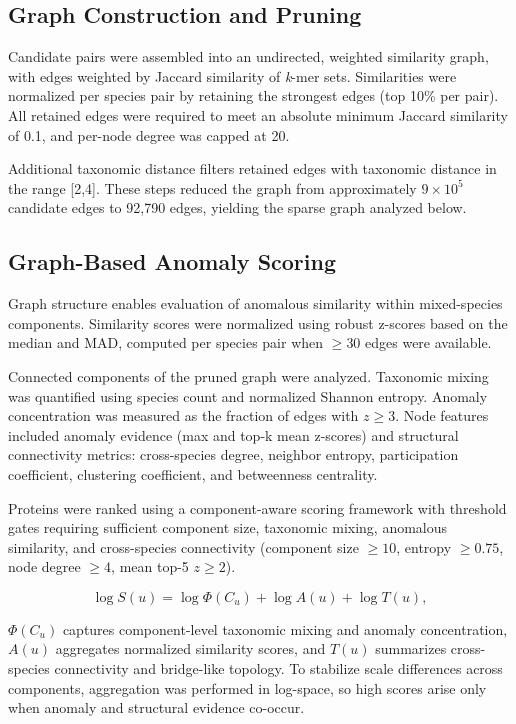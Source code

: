\documentclass[11pt]{article}
\begin{document}
\subsection{Graph Construction and Pruning}
Candidate pairs were assembled into an undirected, weighted similarity graph, with edges weighted by Jaccard similarity of \textit{k}-mer sets. Similarities were normalized per species pair by retaining the strongest edges (top 10\% per pair). All retained edges were required to meet an absolute minimum Jaccard similarity of 0.1, and per-node degree was capped at 20.


Additional taxonomic distance filters retained edges with taxonomic distance in the range [2,4]. These steps reduced the graph from approximately $9\times 10^5$ candidate edges to 92{,}790 edges, yielding the sparse graph analyzed below.

\subsection{Graph-Based Anomaly Scoring}
Graph structure enables evaluation of anomalous similarity within mixed-species components. Similarity scores were normalized using robust z-scores based on the median and MAD\cite{Rousseeuw1993}, computed per species pair when $\ge30$ edges were available.

Connected components of the pruned graph were analyzed. 
Taxonomic mixing was quantified using species count and normalized Shannon entropy. Anomaly concentration was measured as the fraction of edges with $z\ge3$. Node features included anomaly evidence (max and top-k mean z-scores) and structural connectivity metrics: cross-species degree, neighbor entropy, participation coefficient\cite{Guimera2005}, clustering coefficient, and betweenness centrality.

Proteins were ranked using a component-aware scoring framework with threshold gates requiring sufficient component size, taxonomic mixing, anomalous similarity, and cross-species connectivity (component size $\ge10$, entropy $\ge0.75$, node degree $\ge4$, mean top-5 $z\ge2$).

\begin{equation}
\log S(u) = \log \Phi(C_u) + \log A(u) + \log T(u),
\end{equation}

$\Phi(C_u)$ captures component-level taxonomic mixing and anomaly concentration, $A(u)$ aggregates normalized similarity scores, and $T(u)$ summarizes cross-species connectivity and bridge-like topology. To stabilize scale differences across components, aggregation was performed in log-space, so high scores arise only when anomaly and structural evidence co-occur.
\end{document}
